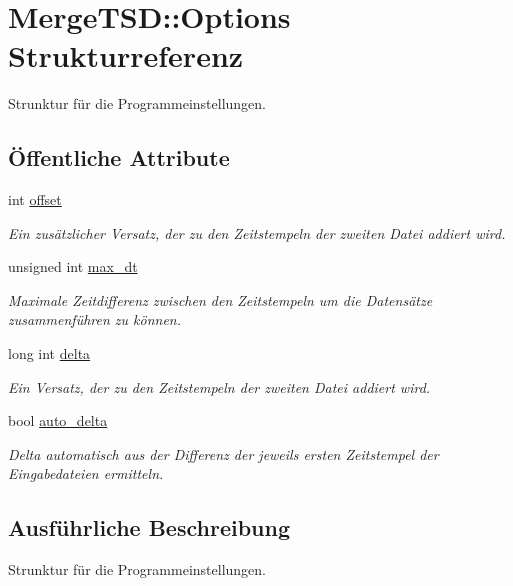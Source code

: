 \hypertarget{structMergeTSD_1_1Options}{\section{Merge\-T\-S\-D\-:\-:Options Strukturreferenz}
\label{structMergeTSD_1_1Options}
}


Strunktur für die Programmeinstellungen.  


\subsection*{Öffentliche Attribute}
\begin{DoxyCompactItemize}
\item 
int \hyperlink{structMergeTSD_1_1Options_ac83ae2ea134ea0377d85739d2436ccff}{offset}
\begin{DoxyCompactList}\small\item\em Ein zusätzlicher Versatz, der zu den Zeitstempeln der zweiten Datei addiert wird. \end{DoxyCompactList}\item 
unsigned int \hyperlink{structMergeTSD_1_1Options_a6fa812feda6841eff6455772f6f42980}{max\-\_\-dt}
\begin{DoxyCompactList}\small\item\em Maximale Zeitdifferenz zwischen den Zeitstempeln um die Datensätze zusammenführen zu können. \end{DoxyCompactList}\item 
long int \hyperlink{structMergeTSD_1_1Options_a9d6eb15b0c9103bb0f3a2cbe098cb9a1}{delta}
\begin{DoxyCompactList}\small\item\em Ein Versatz, der zu den Zeitstempeln der zweiten Datei addiert wird. \end{DoxyCompactList}\item 
bool \hyperlink{structMergeTSD_1_1Options_a59137e1e5d0466ddce1e5b70afec8f86}{auto\-\_\-delta}
\begin{DoxyCompactList}\small\item\em Delta automatisch aus der Differenz der jeweils ersten Zeitstempel der Eingabedateien ermitteln. \end{DoxyCompactList}\end{DoxyCompactItemize}


\subsection{Ausführliche Beschreibung}
Strunktur für die Programmeinstellungen. 

